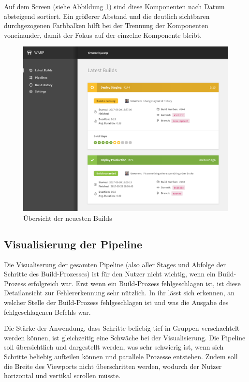 Auf dem Screen (siehe Abbildung \ref{fig:latest-builds}) sind diese Komponenten nach Datum absteigend sortiert. Ein größerer Abstand und die deutlich sichtbaren durchgezogenen Farbbalken hilft bei der Trennung der Komponenten voneinander, damit der Fokus auf der einzelne Komponente bleibt.

\begin{figure}[H]
  \caption{Übersicht der neuesten Builds}
  \label{fig:latest-builds}
  \centering
    \includegraphics[width=\textwidth]{assets/latest-builds}
\end{figure}

\subsection{Visualisierung der Pipeline}

Die Visualiserung der gesamten Pipeline (also aller Stages und Abfolge der Schritte des Build-Prozesses) ist für den Nutzer nicht wichtig, wenn ein Build-Prozess erfolgreich war. Erst wenn ein Build-Prozess fehlgeschlagen ist, ist diese Detailansicht zur Fehlererkennung sehr nützlich. In ihr lässt sich erkennen, an welcher Stelle der Build-Prozess fehlgeschlagen ist und was die Ausgabe des fehlgeschlagenen Befehls war.

Die Stärke der Anwendung, dass Schritte beliebig tief in Gruppen verschachtelt werden können, ist gleichzeitig eine Schwäche bei der Visualisierung. Die Pipeline soll übersichtlich und dargestellt werden, was sehr schwierig ist, wenn sich Schritte beliebig aufteilen können und parallele Prozesse entstehen. Zudem soll die Breite des Viewports nicht überschritten werden, wodurch der Nutzer horizontal und vertikal scrollen müsste.

